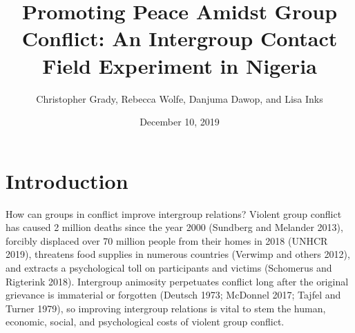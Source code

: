 \documentclass[11pt]{article}
\title{Promoting Peace Amidst Group Conflict: An Intergroup Contact Field
Experiment in Nigeria}
\author{
Christopher Grady, Rebecca Wolfe, Danjuma Dawop, and Lisa Inks
}
\date{December 10, 2019}
\begin{document}
\VerbatimFootnotes

%
%
%
%
%
%
%
%
%
%

\maketitle

\hypertarget{introduction}{%
\section{Introduction}\label{introduction}}

How can groups in conflict improve intergroup relations? Violent group
conflict has caused 2 million deaths since the year 2000 (Sundberg and
Melander 2013), forcibly displaced over 70 million people from their
homes in 2018 (UNHCR 2019), threatens food supplies in numerous
countries (Verwimp and others 2012), and extracts a psychological toll
on participants and victims (Schomerus and Rigterink 2018). Intergroup
animosity perpetuates conflict long after the original grievance is
immaterial or forgotten (Deutsch 1973; McDonnel 2017; Tajfel and Turner
1979), so improving intergroup relations is vital to stem the human,
economic, social, and psychological costs of violent group conflict.
\end{document}

